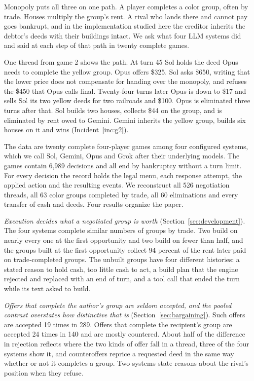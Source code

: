 Monopoly puts all three on one path. A player completes a color group, often by trade. Houses multiply the group's rent. A rival who lands there and cannot pay goes bankrupt, and in the implementation studied here the creditor inherits the debtor's deeds with their buildings intact. We ask what four LLM systems did and said at each step of that path in twenty complete games.

One thread from game 2 shows the path. At turn 45 Sol holds the deed Opus needs to complete the yellow group. Opus offers \$325. Sol asks \$650, writing that the lower price does not compensate for handing over the monopoly, and refuses the \$450 that Opus calls final. Twenty-four turns later Opus is down to \$17 and sells Sol its two yellow deeds for two railroads and \$100. Opus is eliminated three turns after that. Sol builds two houses, collects \$44 on the group, and is eliminated by rent owed to Gemini. Gemini inherits the yellow group, builds six houses on it and wins (Incident~\ref{inc:g2}).

The data are twenty complete four-player games among four configured systems, which we call Sol, Gemini, Opus and Grok after their underlying models. The games contain 6,989 decisions and all end by bankruptcy without a turn limit. For every decision the record holds the legal menu, each response attempt, the applied action and the resulting events. We reconstruct all 526 negotiation threads, all 63 color groups completed by trade, all 60 eliminations and every transfer of cash and deeds. Four results organize the paper.

\emph{Execution decides what a negotiated group is worth} (Section~\ref{sec:development}). The four systems complete similar numbers of groups by trade. Two build on nearly every one at the first opportunity and two build on fewer than half, and the groups built at the first opportunity collect 94 percent of the rent later paid on trade-completed groups. The unbuilt groups have four different histories: a stated reason to hold cash, too little cash to act, a build plan that the engine rejected and replaced with an end of turn, and a tool call that ended the turn while its text asked to build.

\emph{Offers that complete the author's group are seldom accepted, and the pooled contrast overstates how distinctive that is} (Section~\ref{sec:bargaining}). Such offers are accepted 19 times in 289. Offers that complete the recipient's group are accepted 24 times in 140 and are mostly countered. About half of the difference in rejection reflects where the two kinds of offer fall in a thread, three of the four systems show it, and counteroffers reprice a requested deed in the same way whether or not it completes a group. Two systems state reasons about the rival's position when they refuse.

